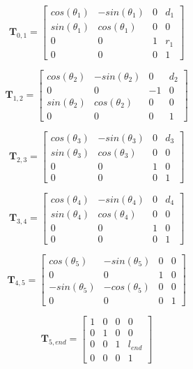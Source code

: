 \begin{multicols}{2}	
	\begin{equation*}
		\bm{T}_{0,1} = \left[\begin{array}{cccc} cos(\theta_1) & -sin(\theta_1) & 0 & d_1 \\ sin(\theta_1) & cos(\theta_1) & 0 & 0 \\ 0 & 0 & 1 & r_1 \\ 0 & 0 & 0 & 1 \end{array}\right]
	\end{equation*}
	
	\begin{equation*}
		\bm{T}_{1,2} = \left[\begin{array}{cccc} cos(\theta_2) & -sin(\theta_2) & 0 & d_2 \\ 0 & 0 & -1 & 0 \\ sin(\theta_2) & cos(\theta_2) & 0 & 0 \\ 0 & 0 & 0 & 1 \end{array}\right]
	\end{equation*}	
	
	\begin{equation*}
		\bm{T}_{2,3} = \left[\begin{array}{cccc} cos(\theta_3) & -sin(\theta_3) & 0 & d_3 \\ sin(\theta_3) & cos(\theta_3) & 0 & 0 \\ 0 & 0 & 1 & 0 \\ 0 & 0 & 0 & 1 \end{array}\right]
	\end{equation*}	
	
	\begin{equation*}
		\bm{T}_{3,4} = \left[\begin{array}{cccc} cos(\theta_4) & -sin(\theta_4) & 0 & d_4 \\ sin(\theta_4) & cos(\theta_4) & 0 & 0 \\ 0 & 0 & 1 & 0 \\ 0 & 0 & 0 & 1 \end{array}\right]
	\end{equation*}	
	
	\begin{equation*}
		\bm{T}_{4,5} = \left[\begin{array}{cccc} cos(\theta_5) & -sin(\theta_5) & 0 & 0 \\ 0 & 0 & 1 & 0 \\ -sin(\theta_5) & -cos(\theta_5) & 0 & 0 \\ 0 & 0 & 0 & 1 \end{array}\right]
	\end{equation*}	
	
	\begin{equation*}
		\bm{T}_{5,end} = \left[\begin{array}{cccc} 1 & 0 & 0 & 0 \\ 0 & 1 & 0 & 0 \\ 0 & 0 & 1 & l_{end} \\ 0 & 0 & 0 & 1 \end{array}\right]
	\end{equation*}	
\end{multicols}


